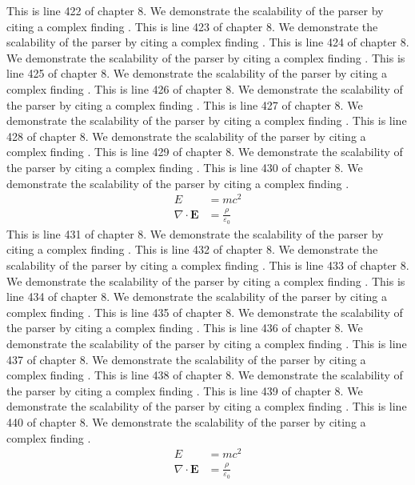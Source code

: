 This is line 422 of chapter 8. We demonstrate the scalability of the parser by citing a complex finding \cite{ref8_422}.
This is line 423 of chapter 8. We demonstrate the scalability of the parser by citing a complex finding \cite{ref8_423}.
This is line 424 of chapter 8. We demonstrate the scalability of the parser by citing a complex finding \cite{ref8_424}.
This is line 425 of chapter 8. We demonstrate the scalability of the parser by citing a complex finding \cite{ref8_425}.
This is line 426 of chapter 8. We demonstrate the scalability of the parser by citing a complex finding \cite{ref8_426}.
This is line 427 of chapter 8. We demonstrate the scalability of the parser by citing a complex finding \cite{ref8_427}.
This is line 428 of chapter 8. We demonstrate the scalability of the parser by citing a complex finding \cite{ref8_428}.
This is line 429 of chapter 8. We demonstrate the scalability of the parser by citing a complex finding \cite{ref8_429}.
This is line 430 of chapter 8. We demonstrate the scalability of the parser by citing a complex finding \cite{ref8_430}.
\begin{align*}
  E &= mc^2 \\
  \nabla \cdot \mathbf{E} &= \frac{\rho}{\varepsilon_0}
\end{align*}
This is line 431 of chapter 8. We demonstrate the scalability of the parser by citing a complex finding \cite{ref8_431}.
This is line 432 of chapter 8. We demonstrate the scalability of the parser by citing a complex finding \cite{ref8_432}.
This is line 433 of chapter 8. We demonstrate the scalability of the parser by citing a complex finding \cite{ref8_433}.
This is line 434 of chapter 8. We demonstrate the scalability of the parser by citing a complex finding \cite{ref8_434}.
This is line 435 of chapter 8. We demonstrate the scalability of the parser by citing a complex finding \cite{ref8_435}.
This is line 436 of chapter 8. We demonstrate the scalability of the parser by citing a complex finding \cite{ref8_436}.
This is line 437 of chapter 8. We demonstrate the scalability of the parser by citing a complex finding \cite{ref8_437}.
This is line 438 of chapter 8. We demonstrate the scalability of the parser by citing a complex finding \cite{ref8_438}.
This is line 439 of chapter 8. We demonstrate the scalability of the parser by citing a complex finding \cite{ref8_439}.
This is line 440 of chapter 8. We demonstrate the scalability of the parser by citing a complex finding \cite{ref8_440}.
\begin{align*}
  E &= mc^2 \\
  \nabla \cdot \mathbf{E} &= \frac{\rho}{\varepsilon_0}
\end{align*}
